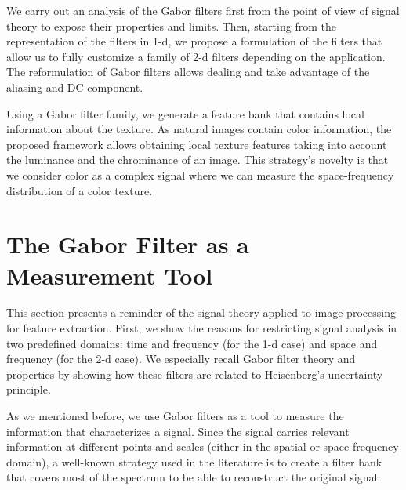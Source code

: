 We carry out an analysis of the Gabor filters first from the point of view of signal theory to expose their properties and limits. Then, starting from the representation of the filters in 1-d, we propose a formulation of the filters that allow us to fully customize a family of 2-d filters depending on the application. The reformulation of Gabor filters allows dealing and take advantage of the aliasing and DC component. 

Using a Gabor filter family, we generate a feature bank that contains local information about the texture. As natural images contain color information, the proposed framework allows obtaining local texture features taking into account the luminance and the chrominance of an image. This strategy's novelty is that we consider color as a complex signal where we can measure the space-frequency distribution of a color texture. 

\section{The Gabor Filter as a Measurement Tool}\label{ch:gabor_filter_description}

This section presents a reminder of the signal theory applied to image processing for feature extraction. First, we show the reasons for restricting signal analysis in two predefined domains: time and frequency (for the 1-d case) and space and frequency (for the 2-d case). We especially recall Gabor filter theory and properties by showing how these filters are related to Heisenberg's uncertainty principle.

As we mentioned before, we use Gabor filters as a tool to measure the information that characterizes a signal. Since the signal carries relevant information at different points and scales (either in the spatial or space-frequency domain), a well-known strategy used in the literature is to create a filter bank that covers most of the spectrum to be able to reconstruct the original signal.

